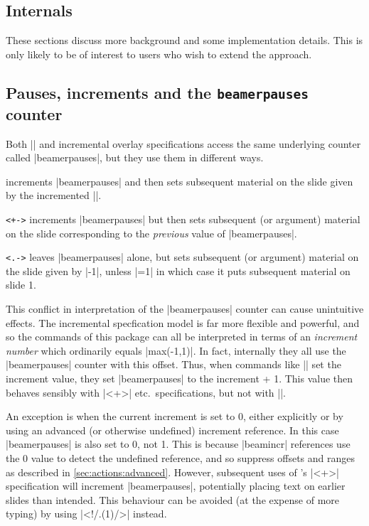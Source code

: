 \documentclass[a4paper]{ltxdoc}
\begin{document}
\begin{gather<>}
\section{Internals}\label{sec:internals}

These sections discuss more background and some implementation details.   This
is only likely to be of interest to users who wish to extend the approach.

\subsection{Pauses, increments and the \texttt{beamerpauses} counter}

Both |\pause| and incremental overlay specifications access the same underlying
counter called |beamerpauses|, but they use them in different ways.

\begin{command}{\pause}
  increments |beamerpauses| and then sets subsequent material on the slide
  given by the incremented |\value{beamerpauses}|. 
\end{command}

\begin{command}{\onslide\texttt{<+->}}
  increments |beamerpauses| but then sets subsequent (or argument) material on
  the slide corresponding to the \emph{previous} value of |beamerpauses|.
\end{command}

\begin{command}{\onslide\texttt{<.->}}
  leaves |beamerpauses| alone, but sets subsequent (or argument) material on the
  slide given by |\value{beamerpauses}-1|, unless |\value{beamerpauses}=1| in
  which case it puts subsequent material on slide 1.
\end{command}
%
This conflict in interpretation of the |beamerpauses| counter can cause
unintuitive effects.  The incremental specfication model is far more flexible
and powerful, and so the commands of this package can all be interpreted in
terms of an \emph{increment number} which ordinarily equals
|max(\value{beamerpauses}-1,1)|.  In fact, internally they all use the
|beamerpauses| counter with this offset.  Thus, when commands like |\resetincr|
set the increment value, they set |beamerpauses| to the increment + 1.  This
value then behaves sensibly with |<+>| etc.\ specifications, but not with
|\pause|.

An exception is when the current increment is set to 0, either explicitly or by
using an advanced (or otherwise undefined) increment reference.  In this case
|beamerpauses| is also set to 0, not 1.  This is because |beamincr| references
use the 0 value to detect the undefined reference, and so suppress offsets and
ranges as described in \cref{sec:actions:advanced}.  However, subsequent uses of
\beamer's |<+>| specification will increment |beamerpauses|, potentially placing
text on earlier slides than intended.  This behaviour can be avoided (at the
expense of more typing) by using |<!/.(1)/>| instead.



\end{gather<>}
\end{document}
